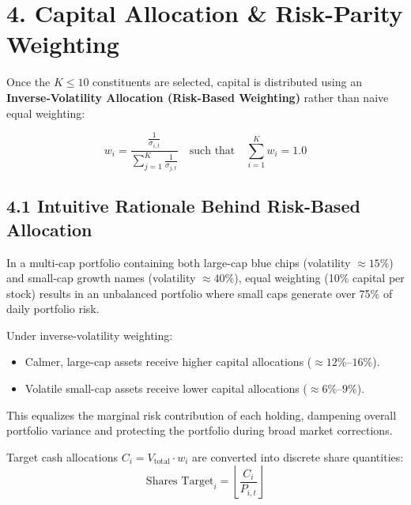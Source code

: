 \documentclass[11pt,a4paper]{article}
\begin{document}
\section{4. Capital Allocation \& Risk-Parity Weighting}
Once the $K \le 10$ constituents are selected, capital is distributed using an \textbf{Inverse-Volatility Allocation (Risk-Based Weighting)} rather than naive equal weighting:

\begin{equation}
    w_i = \frac{\frac{1}{\sigma_{i, t}}}{\sum_{j=1}^K \frac{1}{\sigma_{j, t}}} \quad \text{such that} \quad \sum_{i=1}^K w_i = 1.0
\end{equation}

\subsection{4.1 Intuitive Rationale Behind Risk-Based Allocation}
In a multi-cap portfolio containing both large-cap blue chips (volatility $\approx 15\%$) and small-cap growth names (volatility $\approx 40\%$), equal weighting (10\% capital per stock) results in an unbalanced portfolio where small caps generate over 75\% of daily portfolio risk. 

Under inverse-volatility weighting:
\begin{itemize}[leftmargin=1.5em, itemsep=0.1em]
    \item Calmer, large-cap assets receive higher capital allocations ($\approx 12\%\text{--}16\%$).
    \item Volatile small-cap assets receive lower capital allocations ($\approx 6\%\text{--}9\%$).
\end{itemize}
This equalizes the marginal risk contribution of each holding, dampening overall portfolio variance and protecting the portfolio during broad market corrections.

Target cash allocations $C_i = V_{\text{total}} \cdot w_i$ are converted into discrete share quantities:
\begin{equation}
    \text{Shares Target}_i = \left\lfloor \frac{C_i}{P_{i, t}} \right\rfloor
\end{equation}

\end{document}
